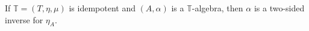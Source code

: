 If $\mathbb{T} = (T, \eta, \mu)$ is idempotent and $(A, \alpha)$ is
a $\mathbb{T}$-algebra, then $\alpha$ is a two-sided inverse for
$\eta_A$.
